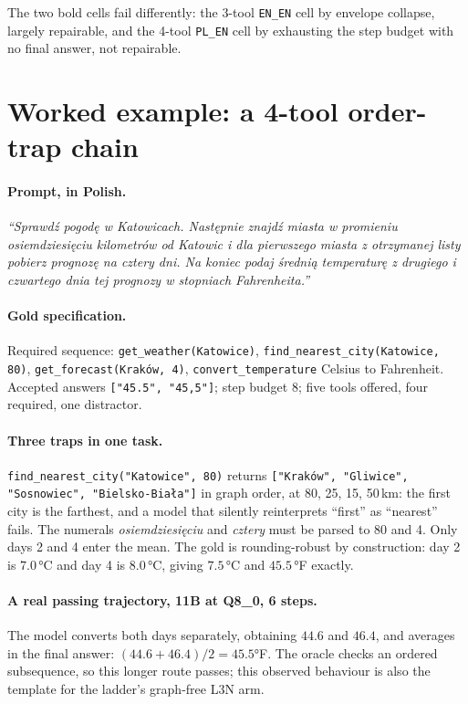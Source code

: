 \documentclass[11pt]{article}
\begin{document}
The two bold cells fail differently: the 3-tool \texttt{EN\_EN} cell by envelope collapse, largely repairable, and the 4-tool \texttt{PL\_EN} cell by exhausting the step budget with no final answer, not repairable.

\FloatBarrier
\section{Worked example: a 4-tool order-trap chain}
\label{app:example}

\paragraph{Prompt, in Polish.} \emph{``Sprawdź pogodę w Katowicach. Następnie znajdź miasta w promieniu osiemdziesięciu kilometrów od Katowic i dla pierwszego miasta z otrzymanej listy pobierz prognozę na cztery dni. Na koniec podaj średnią temperaturę z drugiego i czwartego dnia tej prognozy w stopniach Fahrenheita.''}

\begin{sloppypar}
\paragraph{Gold specification.} Required sequence: \texttt{get\_weather(Katowice)}, \texttt{find\_nearest\_city(Katowice, 80)}, \texttt{get\_forecast(Kraków, 4)}, \texttt{convert\_temperature} Celsius to Fahrenheit. Accepted answers \texttt{["45.5", "45,5"]}; step budget 8; five tools offered, four required, one distractor.

\paragraph{Three traps in one task.} \texttt{find\_nearest\_city("Katowice", 80)} returns \texttt{["Kraków", "Gliwice", "Sosnowiec", "Bielsko-Biała"]} in graph order, at 80, 25, 15, 50\,km: the first city is the farthest, and a model that silently reinterprets ``first'' as ``nearest'' fails. The numerals \emph{osiemdziesięciu} and \emph{cztery} must be parsed to 80 and 4. Only days 2 and 4 enter the mean. The gold is rounding-robust by construction: day 2 is $7.0$\,°C and day 4 is $8.0$\,°C, giving $7.5$\,°C and $45.5$\,°F exactly.
\end{sloppypar}

\paragraph{A real passing trajectory, 11B at Q8\_0, 6 steps.} The model converts both days separately, obtaining $44.6$ and $46.4$, and averages in the final answer: $(44.6+46.4)/2 = 45.5$°F. The oracle checks an ordered subsequence, so this longer route passes; this observed behaviour is also the template for the ladder's graph-free L3N arm.
\end{document}
